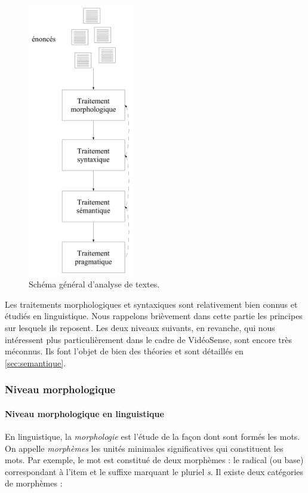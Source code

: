 \begin{figure}%
  \centering\includegraphics[height =
  12cm]{2_Etat-art/img/sequence-traitement-taln}

  \caption{Schéma général d'analyse de
    textes.}\label{fig:sequence-traitement-taln}
\end{figure}

Les traitements morphologiques et syntaxiques sont
relativement bien connus et étudiés en linguistique. Nous rappelons brièvement dans cette partie les principes sur lesquels ils reposent. Les deux niveaux suivants, en revanche, qui nous intéressent plus particulièrement dans le cadre de VidéoSense, sont encore très méconnus. Ils font l'objet de bien des théories et sont détaillés en \ref{sec:semantique}.

\subsubsection{Niveau morphologique}\label{sec:niveau-morphologique}

\paragraph{Niveau morphologique en linguistique}

En linguistique, la \emph{morphologie} est l'étude de la façon dont
sont formés les mots. On appelle \emph{morphèmes} les unités minimales
significatives qui constituent les mots. Par exemple, le mot
 est constitué de deux morphèmes : le radical (ou base)
correspondant à l'item  et le suffixe marquant le
pluriel \emph{s}. Il existe deux catégories de morphèmes :

